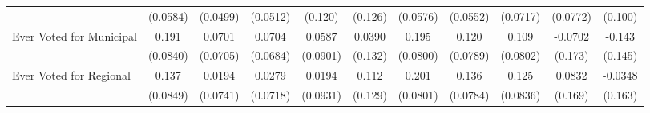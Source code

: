 {\begin{tabular}{l*{10}{c}}
            &    (0.0584)         &    (0.0499)         &    (0.0512)         &     (0.120)         &     (0.126)         &    (0.0576)         &    (0.0552)         &    (0.0717)         &    (0.0772)         &     (0.100)         \\
\addlinespace
Ever Voted for Municipal&       0.191\sym{*}  &      0.0701         &      0.0704         &      0.0587         &      0.0390         &       0.195\sym{*}  &       0.120         &       0.109         &     -0.0702         &      -0.143         \\
            &    (0.0840)         &    (0.0705)         &    (0.0684)         &    (0.0901)         &     (0.132)         &    (0.0800)         &    (0.0789)         &    (0.0802)         &     (0.173)         &     (0.145)         \\
\addlinespace
Ever Voted for Regional&       0.137         &      0.0194         &      0.0279         &      0.0194         &       0.112         &       0.201\sym{*}  &       0.136         &       0.125         &      0.0832         &     -0.0348         \\
            &    (0.0849)         &    (0.0741)         &    (0.0718)         &    (0.0931)         &     (0.129)         &    (0.0801)         &    (0.0784)         &    (0.0836)         &     (0.169)         &     (0.163)         \\
\bottomrule
\end{tabular}
}
